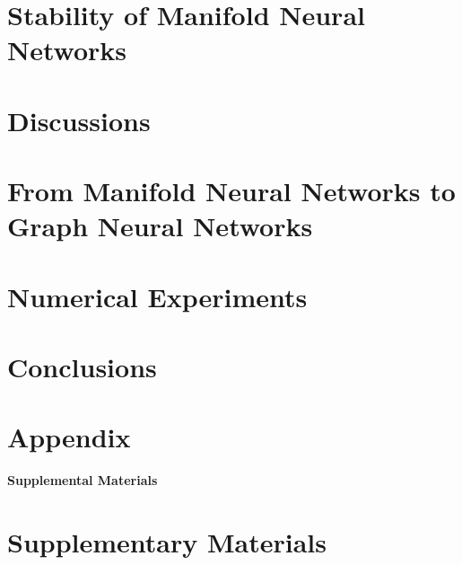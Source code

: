 \documentclass[journal]{IEEEtran}
\begin{document}
\section{Stability of Manifold Neural Networks}
\label{sec:stability_nn}



\section{Discussions}
\label{subsec:discussion}



\section{From Manifold Neural Networks to Graph Neural Networks}
\label{sec:discre_nn}



\section{Numerical Experiments}
\label{sec:simu}


\section{Conclusions}
\label{sec:conclusion}










\appendix
 {\section{Appendix}
 }

\clearpage
\setcounter{page}{1}
\begin{center}
\textbf{\large Supplemental Materials}
\end{center}

\section{Supplementary Materials}

\end{document}
